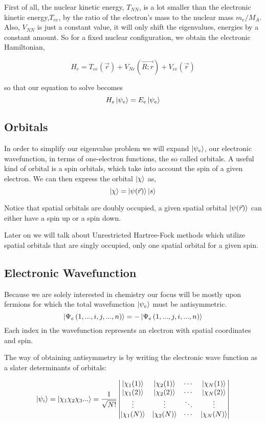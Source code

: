 \documentclass[a4paper]{article}
\begin{document}
First of all, the nuclear kinetic energy, $T_{NN}$, is a lot smaller than the electronic kinetic energy,$T_{ee}$, by the ratio of the electron's mass to the nuclear mass $m_e/M_A$.
Also, $V_{NN}$ is just a constant value, it will only shift the eigenvalues, energies by a constant amount.
So for a fixed nuclear configuration, we obtain the electronic Hamiltonian,

$$
H_{e} =  T_{ee} (\vec{r}) + V_{Ne} (\vec{R;r}) + V_{ee} (\vec{r})
$$

so that our equation to solve becomes
$$
H_e \ket{\psi_e} = E_e \ket{\psi_e}
$$


\subsection{Orbitals}
In order to simplify our eigenvalue problem we will expand $\ket{\psi_e}$, our electronic wavefunction, in terms of one-electron functions, the so called orbitals.
A useful kind of orbital is a spin orbitals, which take into account the spin of a given electron.
We can then express the orbital $\ket{\chi}$ as,
$$ \ket{\chi} = \ket{\psi (\vec{r})} \ket{s} $$

Notice that spatial orbitals are doubly occupied, a given spatial orbital $\ket{\psi (\vec{r})}$ can either have a spin up or a spin down.

Later on we will talk about Unrestricted Hartree-Fock methods which utilize spatial orbitals that are singly occupied, only one spatial orbital for a given spin.

\subsection{Electronic Wavefunction}
Because we are solely interested in chemistry our focus will be mostly upon fermions for which the total wavefunction $\ket{\psi_e}$ must be antisymmetric. 
$$ \ket{\Psi_e\left(1,...,i, j,...,n \right)} = - \ket{\Psi_e\left(1,...,j, i,...,n \right)} $$
Each index in the wavefunction represents an electron with spatial coordinates and spin.

The way of obtaining antisymmetry is by writing the electronic wave function as a slater determinants of orbitals:

$$
\ket{\psi_i} = \ket{\chi_1 \chi_2 \chi_3 ...}  =
\frac{1}{\sqrt{N!}}
\begin{vmatrix}
\ket{\chi_1 (1)} & \ket{\chi_2 (1)} & \cdots & \ket{\chi_N (1)} \\ 
\ket{\chi_1 (2)} & \ket{\chi_2 (2)} & \cdots & \ket{\chi_N (2)} \\
\vdots & \vdots & \ddots &\vdots \\
\ket{\chi_1 (N)} & \ket{\chi_2 (N)} & \cdots & \ket{\chi_N (N)} \\
\end{vmatrix}
$$
\end{document}
